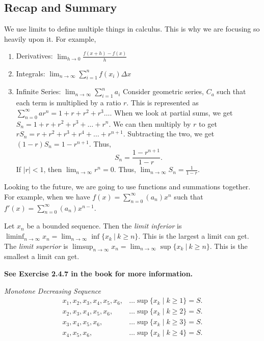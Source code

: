 \subsection{Recap and Summary}

We use limits to define multiple things in calculus. This is why we are focusing so heavily upon it. For example,

\begin{enumerate}
    \item Derivatives: \(\lim_{h \to 0} \frac{f(x + h) - f(x)}{h}\)
    \item Integrals: \(\lim_{n \to \infty} \sum_{i = 1}^{n} f(x_i) \Delta x\)
    \item Infinite Series: \(\lim_{n \to \infty} \sum_{i = 1}^{n} a_i\)
          Consider geometric series, \(C_a\) such that each term is multiplied by a ratio \(r\). This is represented as \(\sum_{n=0}^\infty ar^n = 1 + r + r^2 + r^3\dots\). When we look at partial sums, we get \(S_n = 1 + r + r^2 + r^3 + \dots + r^n\). We can then multiply by \(r\) to get \(rS_n = r + r^2 + r^3 + r^4 + \dots + r^{n+1}\). Subtracting the two, we get \((1 - r)S_n = 1 - r^{n+1}\). Thus, \[S_n = \frac{1 - r^{n+1}}{1 - r}.\] If \(|r| < 1\), then \(\lim_{n \to \infty} r^n = 0\). Thus, \(\lim_{n \to \infty} S_n = \frac{1}{1 - r}\).
\end{enumerate}

Looking to the future, we are going to use functions and summations together. For example, when we have \(f(x) = \sum_{n=0}^\infty (a_n)x^n\) such that \(f'(x) = \sum_{n=0}^\infty (a_n)x^{n-1}\).



\begin{definition}
    Let \(x_n\) be a bounded sequence. Then the \textit{limit inferior} is \(\liminf_{n \to \infty} x_n = \lim_{n \to \infty} \inf\{x_k \ | \ k \geq n\}\). This is the largest a limit can get. The \textit{limit superior} is \(\limsup_{n \to \infty} x_n = \lim_{n \to \infty} \sup\{x_k \ | \ k \geq n\}\). This is the smallest a limit can get.
\end{definition}

\textbf{See Exercise 2.4.7 in the book for more information.}

\begin{example}
    {\textit{Monotone Decreasing Sequence}} \begin{align*}
        x_1, x_2, x_3, x_4, x_5, x_6, & \dots \sup\{x_k \mid k \geq 1\} = S. \\
        x_2, x_3, x_4, x_5, x_6,      & \dots \sup\{x_k \mid k \geq 2\} = S. \\
        x_3, x_4, x_5, x_6,           & \dots \sup\{x_k \mid k \geq 3\} = S. \\
        x_4, x_5, x_6,                & \dots \sup\{x_k \mid k \geq 4\} = S.
    \end{align*}
\end{example}


